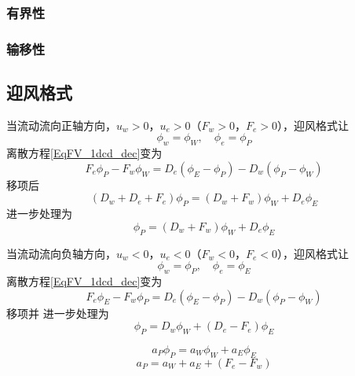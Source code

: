\subsubsection{有界性}

\subsubsection{输移性}

\subsection{迎风格式}
当流动流向正轴方向，$u_{w}>0$，$u_{e}>0$（$F_{w}>0$，$F_{e}>0$），迎风格式让
\begin{equation}
  \phi_{w} = \phi_{W}
  ,\quad
  \phi_{e} = \phi_{P}
\end{equation}
离散方程\eqref{EqFV_1dcd_dec}变为
\begin{equation}
  F_{e}\phi_{P} - F_{w}\phi_{W} 
  =
  D_{e}(\phi_{E}-\phi_{P})
  -
  D_{w}(\phi_{P}-\phi_{W})
\end{equation}
移项后
\begin{equation}
  (D_{w}+D_{e}+F_{e})\phi_{P}
  =
  (D_{w}+F_{w})\phi_{W}
  +
  D_{e}\phi_{E}
\end{equation}
进一步处理为
\begin{equation}
  [(D_{w}+F_{w})+D_{e}+(F_{e}-F_{w})]\phi_{P}
  =
  (D_{w}+F_{w})\phi_{W}
  +
  D_{e}\phi_{E}
\end{equation}


当流动流向负轴方向，$u_{w}<0$，$u_{e}<0$（$F_{w}<0$，$F_{e}<0$），迎风格式让
\begin{equation}
  \phi_{w} = \phi_{P}
  ,\quad
  \phi_{e} = \phi_{E}
\end{equation}
离散方程\eqref{EqFV_1dcd_dec}变为
\begin{equation}
  F_{e}\phi_{E} - F_{w}\phi_{P} 
  =
  D_{e}(\phi_{E}-\phi_{P})
  -
  D_{w}(\phi_{P}-\phi_{W})
\end{equation}
移项并
进一步处理为
\begin{equation}
  [D_{w}+(D_{e}-F_{w})+(F_{e}-F_{w})]\phi_{P}
  =
  D_{w}\phi_{W}
  +
  (D_{e}-F_{e})\phi_{E}
\end{equation}

\begin{equation}
  a_{P}\phi_{P}
  =
  a_{W}\phi_{W}
  +
  a_{E}\phi_{E}
\end{equation}
\begin{equation}
  a_{P} 
  =
  a_{W}
  +
  a_{E}
  +
  (F_{e}-F_{w})
\end{equation}


